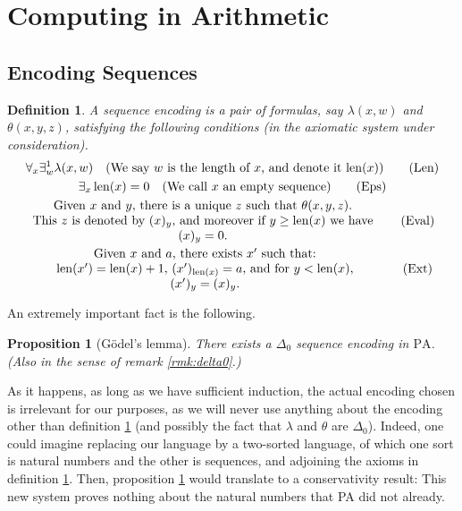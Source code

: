 \documentclass{article}
\newtheorem{prop}[theorem]{Proposition}
\newtheorem{definition}[theorem]{Definition}
\theoremstyle{nonumberplain}
\newcommand{\PA}{\mathrm{PA}}
\DeclareMathOperator{\len}{len}
\begin{document}
\section{Computing in Arithmetic}

\subsection{Encoding Sequences}\label{sec:seqenc}

\begin{definition}\label{def:seqenc}
A \emph{sequence encoding} is a pair of formulas, say $\lambda(x,w)$ and $\theta(x,y,z)$, satisfying the following conditions (in the axiomatic system under consideration).
\begin{gather}
\forall_x \exists^1_w \lambda(x,w) \quad\text{(We say $w$ is the length of $x$, and denote it $\len(x)$)} \tag{Len}\\
\exists_x \len(x) = 0 \quad\text{(We call $x$ an empty sequence)} \tag{Eps} \label{ax:eps}\\
\parbox{0.8\linewidth}{\centering Given $x$ and $y$, there is a unique $z$ such that $\theta(x,y,z)$. \\ This $z$ is denoted by $(x)_y$, and moreover if $y \geq \len(x)$ we have $(x)_y = 0$.} \tag{Eval}\\
\parbox{0.8\linewidth}{\centering Given $x$ and $a$, there exists $x'$ such that: \\ $\len(x') = \len(x) + 1$, $(x')_{\len(x)} = a$, and for $y < \len(x)$, $(x')_y = (x)_y$.} \tag{Ext}\label{ax:ext}
\end{gather}
\end{definition}

An extremely important fact is the following.

\begin{prop}[Gödel's lemma]\label{prop:godellemma}
There exists a $\Delta_0$ sequence encoding in $\PA$. (Also in the sense of remark \ref{rmk:delta0}.)
\end{prop}

As it happens, as long as we have sufficient induction, the actual encoding chosen is irrelevant for our purposes, as we will never use anything about the encoding other than definition \ref{def:seqenc} (and possibly the fact that $\lambda$ and $\theta$ are $\Delta_0$). Indeed, one could imagine replacing our language by a two-sorted language, of which one sort is natural numbers and the other is sequences, and adjoining the axioms in definition \ref{def:seqenc}. Then, proposition \ref{prop:godellemma} would translate to a conservativity result: This new system proves nothing about the natural numbers that PA did not already.
\end{document}
